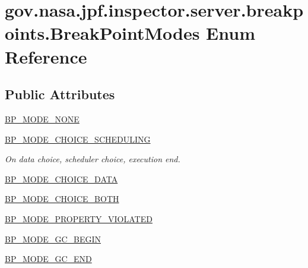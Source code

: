 \hypertarget{enumgov_1_1nasa_1_1jpf_1_1inspector_1_1server_1_1breakpoints_1_1_break_point_modes}{}\section{gov.\+nasa.\+jpf.\+inspector.\+server.\+breakpoints.\+Break\+Point\+Modes Enum Reference}
\label{enumgov_1_1nasa_1_1jpf_1_1inspector_1_1server_1_1breakpoints_1_1_break_point_modes}
\subsection*{Public Attributes}
\begin{DoxyCompactItemize}
\item 
\hyperlink{enumgov_1_1nasa_1_1jpf_1_1inspector_1_1server_1_1breakpoints_1_1_break_point_modes_a60e94673a7e82fdef5b76d904bd77a02}{B\+P\+\_\+\+M\+O\+D\+E\+\_\+\+N\+O\+NE}
\item 
\hyperlink{enumgov_1_1nasa_1_1jpf_1_1inspector_1_1server_1_1breakpoints_1_1_break_point_modes_a9debdc03839e4ea73695d7f206f6967c}{B\+P\+\_\+\+M\+O\+D\+E\+\_\+\+C\+H\+O\+I\+C\+E\+\_\+\+S\+C\+H\+E\+D\+U\+L\+I\+NG}
\begin{DoxyCompactList}\small\item\em On data choice, scheduler choice, execution end. \end{DoxyCompactList}\item 
\hyperlink{enumgov_1_1nasa_1_1jpf_1_1inspector_1_1server_1_1breakpoints_1_1_break_point_modes_a9d72dd93aedc29e450b202ddf53869df}{B\+P\+\_\+\+M\+O\+D\+E\+\_\+\+C\+H\+O\+I\+C\+E\+\_\+\+D\+A\+TA}
\item 
\hyperlink{enumgov_1_1nasa_1_1jpf_1_1inspector_1_1server_1_1breakpoints_1_1_break_point_modes_a62ce602b1a74685e3de4fc20eb656c2b}{B\+P\+\_\+\+M\+O\+D\+E\+\_\+\+C\+H\+O\+I\+C\+E\+\_\+\+B\+O\+TH}
\item 
\hyperlink{enumgov_1_1nasa_1_1jpf_1_1inspector_1_1server_1_1breakpoints_1_1_break_point_modes_ad782a81f4cdf5af8ecf2701a7ac20bee}{B\+P\+\_\+\+M\+O\+D\+E\+\_\+\+P\+R\+O\+P\+E\+R\+T\+Y\+\_\+\+V\+I\+O\+L\+A\+T\+ED}
\item 
\hyperlink{enumgov_1_1nasa_1_1jpf_1_1inspector_1_1server_1_1breakpoints_1_1_break_point_modes_acd46130394bfeb9c7b8f164dcd0d59b0}{B\+P\+\_\+\+M\+O\+D\+E\+\_\+\+G\+C\+\_\+\+B\+E\+G\+IN}
\item 
\hyperlink{enumgov_1_1nasa_1_1jpf_1_1inspector_1_1server_1_1breakpoints_1_1_break_point_modes_a726089f34488698c58b7693a8429cfe3}{B\+P\+\_\+\+M\+O\+D\+E\+\_\+\+G\+C\+\_\+\+E\+ND}

\end{DoxyCompactItemize}
